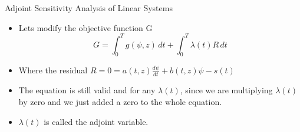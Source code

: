 \documentclass[10pt]{beamer}
\begin{document}
\begin{frame}{Adjoint Sensitivity Analysis of Linear Systems}
	\begin{itemize}
		\item  Lets modify the objective function G
		\begin{equation}
G =  \int^{T}_0  g(\psi,z) \, dt + \int^{T}_0 \lambda(t) R \, dt 
		\end{equation}
		\item Where the residual $R = 0 =  a(t,z)\frac{d \psi}{dt} +b(t,z) \psi- s(t) $
		\item The  equation is still valid and for any $\lambda(t)$, since we are multiplying $\lambda(t)$ by zero and we just added a zero to the whole equation. 
		\item $\lambda(t)$ is called the adjoint variable.
	\end{itemize}
\end{frame}
\end{document}
